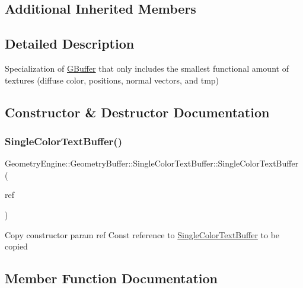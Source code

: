 \subsection*{Additional Inherited Members}


\subsection{Detailed Description}
Specialization of \mbox{\hyperlink{class_geometry_engine_1_1_geometry_buffer_1_1_g_buffer}{G\+Buffer}} that only includes the smallest functional amount of textures (diffuse color, positions, normal vectors, and tmp) 

\subsection{Constructor \& Destructor Documentation}
\mbox{\label{class_geometry_engine_1_1_geometry_buffer_1_1_single_color_text_buffer_ad0e30e16f3630ecf9ca654688b964067}} 
\subsubsection{\texorpdfstring{SingleColorTextBuffer()}{SingleColorTextBuffer()}}
{\footnotesize\ttfamily Geometry\+Engine\+::\+Geometry\+Buffer\+::\+Single\+Color\+Text\+Buffer\+::\+Single\+Color\+Text\+Buffer (\begin{DoxyParamCaption}\item[{const \mbox{\hyperlink{class_geometry_engine_1_1_geometry_buffer_1_1_single_color_text_buffer}{Single\+Color\+Text\+Buffer}} \&}]{ref }\end{DoxyParamCaption})}

Copy constructor param ref Const reference to \mbox{\hyperlink{class_geometry_engine_1_1_geometry_buffer_1_1_single_color_text_buffer}{Single\+Color\+Text\+Buffer}} to be copied 

\subsection{Member Function Documentation}
\mbox{\label{class_geometry_engine_1_1_geometry_buffer_1_1_single_color_text_buffer_add00c2857f9d425600ef83d50a9c8019}} 
